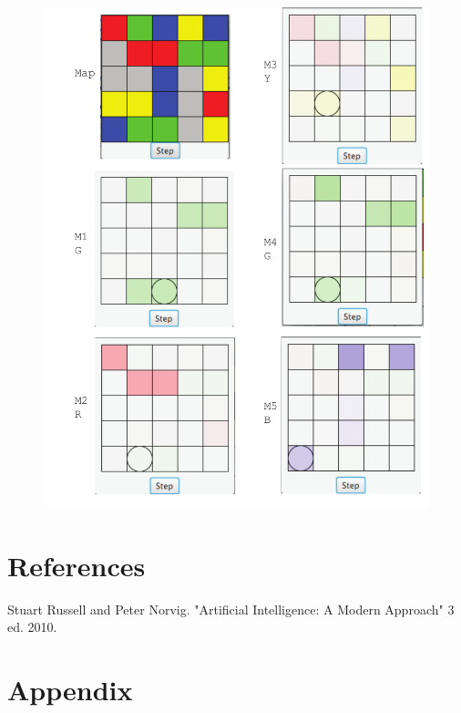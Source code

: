 \documentclass{article}
\begin{document}
\begin{figure}[H]
\centering
\includegraphics[scale=0.8]{exampleb.pdf}
\end{figure}

\vspace{100cm}
\section{References}
Stuart Russell and Peter Norvig. "Artificial Intelligence: A Modern Approach" 3 ed. 2010.

\section{Appendix}
\end{document}
